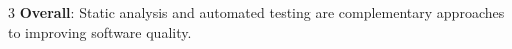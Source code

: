 \documentclass[a4paper, 10pt, landscape]{article}
\begin{document}
\begin{multicols*}{3}
\textbf{Overall}: Static analysis and automated testing are complementary approaches to improving software quality. 












\end{multicols*}
\end{document}
